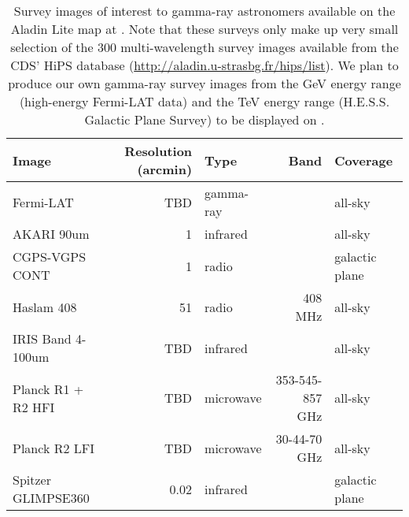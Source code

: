 \begin{table}[bt]

\caption{
Survey images of interest to gamma-ray astronomers available on the Aladin Lite map at \gammasky . Note that these surveys only make up very small selection of the 300 multi-wavelength survey images available from the CDS' HiPS database (\protect\url{http://aladin.u-strasbg.fr/hips/list}). We plan to produce our own gamma-ray survey images from the GeV energy range (high-energy Fermi-LAT data) and the TeV energy range (H.E.S.S. Galactic Plane Survey) to be displayed on \gammasky .
}

\label{tab:images}
\begin{tabular}{ lrlrl }
\hline
Image & Resolution (arcmin) & Type & Band & Coverage\\
\hline
Fermi-LAT & TBD & gamma-ray &  & all-sky\\
AKARI 90um & 1 & infrared &  & all-sky\\
CGPS-VGPS CONT & 1 & radio &  & galactic plane\\
Haslam 408 & 51 & radio & 408 MHz & all-sky\\
IRIS Band 4-100um & TBD & infrared &  & all-sky\\
Planck R1 + R2 HFI & TBD & microwave & 353-545-857 GHz & all-sky\\
Planck R2 LFI & TBD & microwave & 30-44-70 GHz & all-sky\\
Spitzer GLIMPSE360 & 0.02 & infrared &  & galactic plane\\
\hline
\end{tabular}

\end{table}

